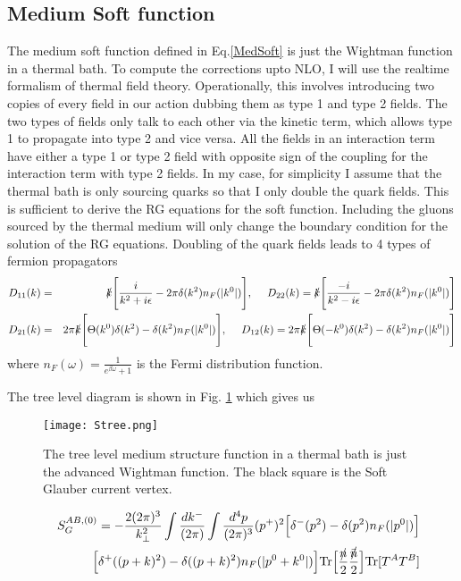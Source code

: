\documentclass[letter,11pt]{article}
\newcommand{\nn}{\nonumber}
\newcommand{\bea}{\begin{eqnarray}}
\newcommand{\eea}{\end{eqnarray}}
\def\nn{\nonumber}
\begin{document}

\subsection{Medium Soft function} 
The medium soft function defined in Eq.\ref{MedSoft} is just the Wightman function in a thermal bath. 
To compute the corrections upto NLO, I will use the realtime formalism of thermal field theory. Operationally, this involves introducing two copies of every field in our action dubbing them as type 1 and type 2 fields. The two types of fields only talk to each other via the kinetic term, which allows type 1 to propagate into type 2 and vice versa. All the fields in an interaction term have either a type 1 or type 2 field with opposite sign of the coupling for the interaction term with type 2 fields. In my case, for simplicity I assume that the thermal bath is only sourcing quarks so that I only double the quark fields. This is sufficient to derive the RG equations for the soft function. Including the gluons sourced by the thermal medium will only change the boundary condition for the solution of the RG equations. Doubling of the quark fields leads to 4 types of fermion propagators 
\bea
D_{11}(k) &=&\slashed{k}\Bigg[\frac{i}{k^2+i\epsilon}-2\pi\delta(k^2)n_F(|k^0|)\Bigg] , \ \ \ \ D_{22}(k)= \slashed{k}\Bigg[\frac{-i}{k^2-i\epsilon}-2\pi\delta(k^2)n_F(|k^0|)\Bigg]\nn\\
D_{21}(k) &=& 2\pi\slashed{k}\Bigg[\Theta(k^0)\delta(k^2)-\delta(k^2)n_F(|k^0|)\Bigg], \ \ \ \ D_{12}(k)= 2\pi\slashed{k}\Bigg[\Theta(-k^0)\delta(k^2)-\delta(k^2)n_F(|k^0|)\Bigg]\nn
\eea
where $n_F(\omega) = \frac{1}{e^{\beta \omega}+1}$ is the Fermi distribution function.

The tree level diagram is shown in Fig. \ref{Stree} which gives us 
\begin{figure}
\centering
  \texttt{[image: Stree.png]}
  \caption{The tree level medium structure function in a thermal bath is just the advanced Wightman function. The black square is the Soft Glauber current vertex.}
  \label{Stree}
\end{figure}

\bea
&&S_G^{AB,(0)}= -\frac{2(2\pi)^3}{k_{\perp}^2} \int \frac{dk^-}{(2\pi)}\int \frac{d^4p}{(2\pi)^3}(p^+)^2\Big[\delta^-(p^2)-\delta(p^2)n_F(|p^0|)\Big]\nn\\
&&\Big[\delta^+((p+k)^2)-\delta((p+k)^2)n_F(|p^0+k^0|)\Big]\text{Tr}\Big[ \frac{\slashed{n}}{2}\frac{\slashed{\bar n}}{2}\Big]\text{Tr}[T^AT^B]
\eea
\end{document}
